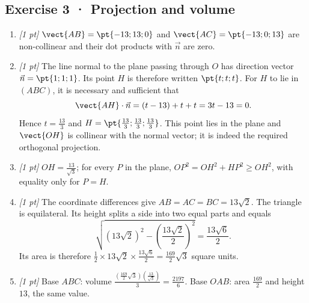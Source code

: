 \subsection*{Exercise 3 · Projection and volume}\begin{enumerate}

\item \textit{[1 pt]} $\vect{AB}=\pt{-13;13;0}$ and $\vect{AC}=\pt{-13;0;13}$ are non-collinear and their dot products with $\vec n$ are zero.

\item \textit{[1 pt]} The line normal to the plane passing through $O$ has direction vector $\vec n=\pt{1;1;1}$. Its point $H$ is therefore written $\pt{t;t;t}$. For $H$ to lie in $(ABC)$, it is necessary and sufficient that
\[\vect{AH}\cdot\vec n=(t-13)+t+t=3t-13=0.\]
Hence $t=\frac{13}{3}$ and $H=\pt{\frac{13}{3};\frac{13}{3};\frac{13}{3}}$. This point lies in the plane and $\vect{OH}$ is collinear with the normal vector; it is indeed the required orthogonal projection.

\item \textit{[1 pt]} $OH=\frac{13}{\sqrt{3}}$; for every $P$ in the plane, $OP^2=OH^2+HP^2\ge OH^2$, with equality only for $P=H$.

\item \textit{[1 pt]} The coordinate differences give $AB=AC=BC=13\sqrt2$. The triangle is equilateral. Its height splits a side into two equal parts and equals
\[\sqrt{(13\sqrt2)^2-(\frac{13\sqrt{2}}{2})^2}=\frac{13\sqrt6}{2}.\]
Its area is therefore $\frac12\times 13\sqrt2\times\frac{13\sqrt6}{2}=\frac{169}{2}\sqrt3$ square units.

\item \textit{[1 pt]} Base $ABC$: volume $\frac{(\frac{169}{2}\sqrt3)(\frac{13}{\sqrt{3}})}{3}=\frac{2197}{6}$. Base $OAB$: area $\frac{169}{2}$ and height $13$, the same value.

\end{enumerate}

